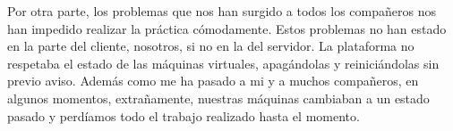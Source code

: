 Por otra parte, los problemas que nos han surgido a todos los compañeros nos han impedido realizar la práctica cómodamente. Estos problemas no han estado en la parte del cliente, nosotros, si no en la del servidor. La plataforma no respetaba el estado de las máquinas virtuales, apagándolas y reiniciándolas sin previo aviso. Además como me ha pasado a mi y a muchos compañeros, en algunos momentos, extrañamente, nuestras máquinas cambiaban a un estado pasado y perdíamos todo el trabajo realizado hasta el momento. \\




